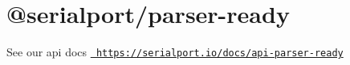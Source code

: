 \chapter{@serialport/parser-\/ready}
\hypertarget{md_Dashboard_2node__modules_2_0dserialport_2parser-ready_2README}{}\label{md_Dashboard_2node__modules_2_0dserialport_2parser-ready_2README}
\label{md_Dashboard_2node__modules_2_0dserialport_2parser-ready_2README_autotoc_md89}%
%
 See our api docs \href{https://serialport.io/docs/api-parser-ready}{\texttt{ https\+://serialport.\+io/docs/api-\/parser-\/ready}} 